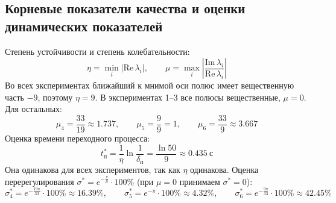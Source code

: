 \documentclass[a4paper, 12pt]{article}
\begin{document}
\subsection{Корневые показатели качества и оценки динамических показателей}
Степень устойчивости и степень колебательности:
\[
    \eta = \min_i |\mathrm{Re}\,\lambda_i|, \qquad \mu = \max_i \left|\frac{\mathrm{Im}\,\lambda_i}{\mathrm{Re}\,\lambda_i}\right|
\]
Во всех экспериментах ближайший к мнимой оси полюс имеет вещественную часть $-9$, поэтому $\eta = 9$. В экспериментах 1--3 все полюсы вещественные, $\mu = 0$. Для остальных:
\[
    \mu_4 = \frac{33}{19} \approx 1.737, \qquad \mu_5 = \frac{9}{9} = 1, \qquad \mu_6 = \frac{33}{9} \approx 3.667
\]
Оценка времени переходного процесса:
\[
    t^*_{\text{п}} = \frac{1}{\eta}\ln{\frac{1}{\delta_{\text{п}}}} = \frac{\ln{50}}{9} \approx 0.435 \ \text{с}
\]
Она одинакова для всех экспериментов, так как $\eta$ одинакова.
\newline
Оценка перерегулирования $\sigma^* = e^{-\frac{\pi}{\mu}} \cdot 100\%$ (при $\mu = 0$ принимаем $\sigma^* = 0$):
\[
    \sigma^*_4 = e^{-\frac{19\pi}{33}} \cdot 100\% \approx 16.39\%, \qquad
    \sigma^*_5 = e^{-\pi} \cdot 100\% \approx 4.32\%, \qquad
    \sigma^*_6 = e^{-\frac{9\pi}{33}} \cdot 100\% \approx 42.45\%
\]
\end{document}
